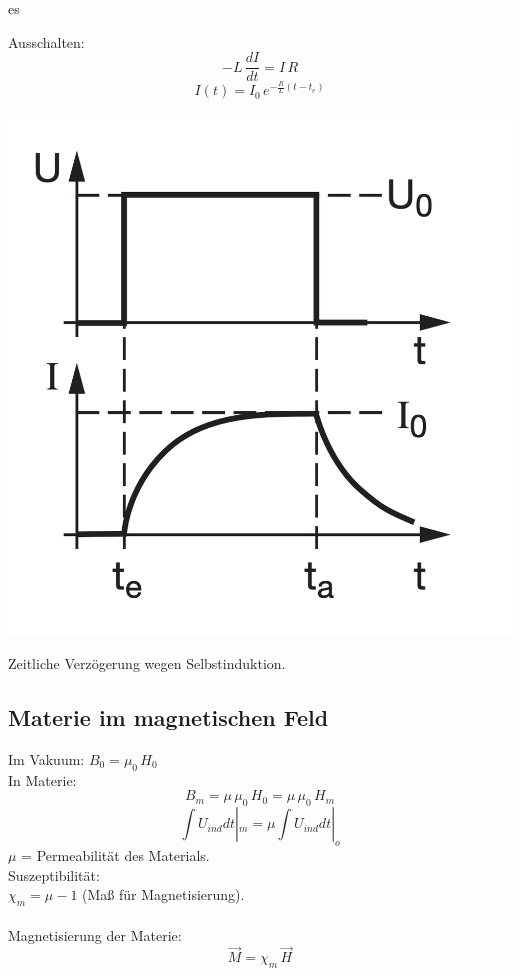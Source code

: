es\documentclass[a4paper, fontsize=8pt, landscape]{scrartcl}
\begin{document}
\begin{multicols*}{4}
    Ausschalten:
    \[-L\,\frac{dI}{dt} = I\,R\]
    \[I(t) = I_0\,e^{-\frac{R}{L}(t - t_e)}\]
    \begin{center}
        \includegraphics[scale=0.2]{Images/diagrammmitsspule.png}
    \end{center}
    Zeitliche Verzögerung wegen Selbstinduktion.
   




\subsection{Materie im magnetischen Feld}
    Im Vakuum: $B_0 = \mu_0\,H_0$\\
    In Materie:
    \[B_m = \mu\,\mu_0\,H_0 = \mu\,\mu_0\,H_m\]
    \[\int U_{ind} dt |_m =  \mu \int U_{ind} dt |_o \]
    $\mu$ = Permeabilität des Materials.\\

    Suszeptibilität:\\
    $\chi_m = \mu - 1$ (Maß für Magnetisierung).\\\\
    Magnetisierung der Materie:
    \[\vec M = \chi_m\,\vec H\]
    

\end{multicols*}
\end{document}
